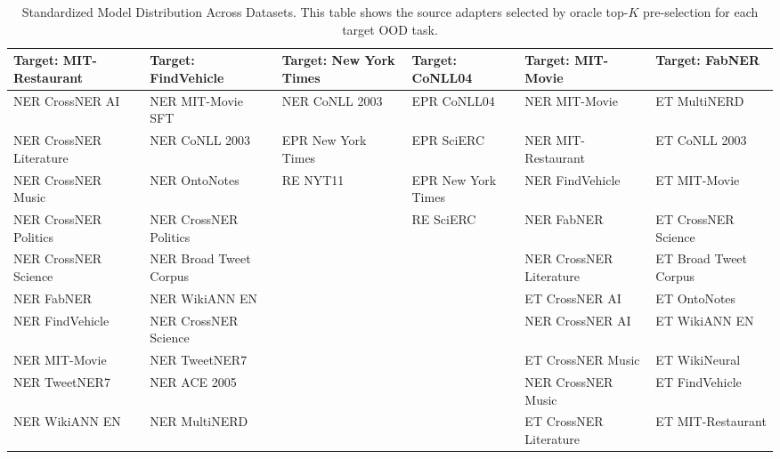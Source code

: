 \begin{table}[htbp]
\small
\centering
\caption{Standardized Model Distribution Across Datasets. This table shows the source adapters selected by oracle top-$K$ pre-selection for each target OOD task.}
\label{tab:model_distribution_standardized}
\vspace{-2mm}
\small
\setlength{\tabcolsep}{1pt}
\begin{tabular}{llllll} 
\toprule
\textbf{Target: MIT-Restaurant} & \textbf{Target: FindVehicle} & \textbf{Target: New York Times} & \textbf{Target: CoNLL04} & \textbf{Target: MIT-Movie} & \textbf{Target: FabNER} \\
\midrule
NER CrossNER AI         & NER MIT-Movie SFT       & NER CoNLL 2003     & EPR CoNLL04         & NER MIT-Movie           & ET MultiNERD \\
NER CrossNER Literature & NER CoNLL 2003          & EPR New York Times & EPR SciERC          & NER MIT-Restaurant      & ET CoNLL 2003 \\
NER CrossNER Music      & NER OntoNotes           & RE NYT11           & EPR New York Times  & NER FindVehicle         & ET MIT-Movie \\
NER CrossNER Politics   & NER CrossNER Politics   &                    & RE SciERC           & NER FabNER              & ET CrossNER Science \\
NER CrossNER Science    & NER Broad Tweet Corpus  &                    &                     & NER CrossNER Literature & ET Broad Tweet Corpus \\
NER FabNER              & NER WikiANN EN          &                    &                     & ET CrossNER AI          & ET OntoNotes \\
NER FindVehicle         & NER CrossNER Science    &                    &                     & NER CrossNER AI         & ET WikiANN EN \\
NER MIT-Movie           & NER TweetNER7           &                    &                     & ET CrossNER Music       & ET WikiNeural \\
NER TweetNER7           & NER ACE 2005            &                    &                     & NER CrossNER Music      & ET FindVehicle \\
NER WikiANN EN          & NER MultiNERD           &                    &                     & ET CrossNER Literature  & ET MIT-Restaurant \\
\bottomrule
\end{tabular}
\vspace{-2mm}
\end{table}

